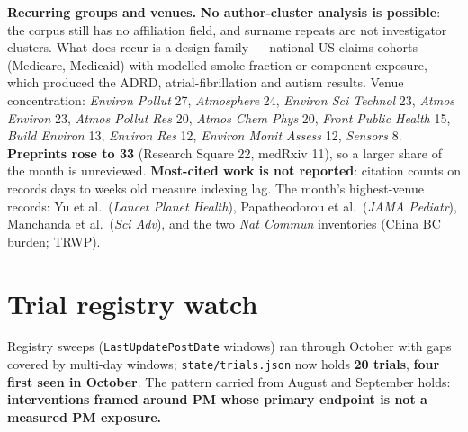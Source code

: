 \documentclass[10pt]{article}
\begin{document}
\vspace{2mm}
\textbf{Recurring groups and venues.} \textbf{No author-cluster analysis is possible}: the corpus still has
no affiliation field, and surname repeats are not investigator clusters. What does recur is a design
family --- national US claims cohorts (Medicare, Medicaid) with modelled smoke-fraction or component
exposure, which produced the ADRD, atrial-fibrillation and autism results. Venue concentration:
\textit{Environ Pollut} 27, \textit{Atmosphere} 24, \textit{Environ Sci Technol} 23, \textit{Atmos Environ}
23, \textit{Atmos Pollut Res} 20, \textit{Atmos Chem Phys} 20, \textit{Front Public Health} 15,
\textit{Build Environ} 13, \textit{Environ Res} 12, \textit{Environ Monit Assess} 12, \textit{Sensors} 8.
\textbf{Preprints rose to 33} (Research Square 22, medRxiv 11), so a larger share of the month is
unreviewed. \textbf{Most-cited work is not reported}: citation counts on records days to weeks old measure
indexing lag. The month's highest-venue records: Yu et al.\ (\textit{Lancet Planet Health}),
Papatheodorou et al.\ (\textit{JAMA Pediatr}), Manchanda et al.\ (\textit{Sci Adv}), and the two
\textit{Nat Commun} inventories (China BC burden; TRWP).

\clearpage

\section*{\sffamily\bfseries\color{Deep}Trial registry watch}
\vspace{-1.5mm}{\color{Coral}\rule{\linewidth}{1.1pt}}\vspace{2.5mm}

\footnotesize
Registry sweeps (\texttt{LastUpdatePostDate} windows) ran through October with gaps covered by multi-day
windows; \texttt{state/trials.json} now holds \textbf{20 trials}, \textbf{four first seen in October}. The
pattern carried from August and September holds: \textbf{interventions framed around PM whose primary
endpoint is not a measured PM exposure.}
\end{document}
